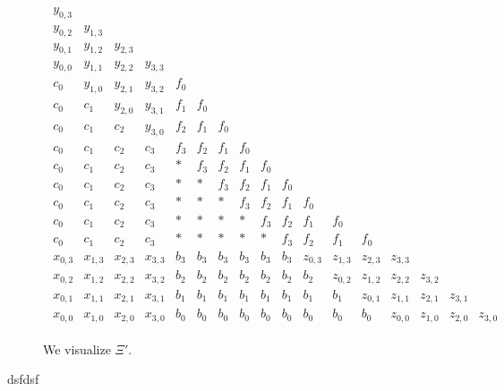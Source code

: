 \begin{figure}[H]
    \begin{align*}
        \begin{array}{cccccccccccccccccccc}
            y_{0,3} & & & & & & & & & & & & \\
            y_{0,2} & y_{1,3} & & & & & & & & & & & \\
            y_{0,1} & y_{1,2} & y_{2,3} & & & & & & & & & & \\
            y_{0,0} & y_{1,1} & y_{2,2} & y_{3,3} & & & & & & & & & \\
            c_0 & y_{1,0} & y_{2,1} & y_{3,2} & f_0 & & & & & & & & \\
            c_0 & c_1 & y_{2,0} & y_{3,1} & f_1 & f_0 & & & & & & & \\
            c_0 & c_1 & c_2 & y_{3,0} & f_2 & f_1 & f_0 & & & & & & \\
            c_0 & c_1 & c_2 & c_3 & f_3 & f_2 & f_1 & f_0 & & & & & \\
            c_0 & c_1 & c_2 & c_3 &  *  & f_3 & f_2 & f_1 & f_0 & & & & \\
            c_0 & c_1 & c_2 & c_3 &  *  & * & f_3 & f_2 & f_1 & f_0 & & & \\
            c_0 & c_1 & c_2 & c_3 &  *  & * & * & f_3 & f_2 & f_1 & f_0 & & \\
            c_0 & c_1 & c_2 & c_3 &  *  & * & * & * & f_3 & f_2 & f_1 & f_0 & \\
            c_0 & c_1 & c_2 & c_3 &  *  & * & * & * & * & f_3 & f_2 & f_1 & f_0 \\
            x_{0,3} & x_{1,3} & x_{2,3} & x_{3,3} & b_3 & b_3 & b_3 & b_3 & b_3 & b_3 & z_{0,3} & z_{1,3} & z_{2,3} & z_{3,3} \\
            x_{0,2} & x_{1,2} & x_{2,2} & x_{3,2} & b_2 & b_2 & b_2 & b_2 & b_2 & b_2 & b_2 & z_{0,2} & z_{1,2} & z_{2,2} & z_{3,2} \\
            x_{0,1} & x_{1,1} & x_{2,1} & x_{3,1} & b_1 & b_1 & b_1 & b_1 & b_1 & b_1 & b_1 & b_1 & z_{0,1} & z_{1,1} & z_{2,1} & z_{3,1} \\
            x_{0,0} & x_{1,0} & x_{2,0} & x_{3,0} & b_0 & b_0 & b_0 & b_0 & b_0 & b_0 & b_0 & b_0 & b_0 & z_{0,0} & z_{1,0} & z_{2,0} & z_{3,0}
        \end{array}
    \end{align*}  
    \caption{We visualize \( \Xi' \).}
\end{figure}

dsfdsf